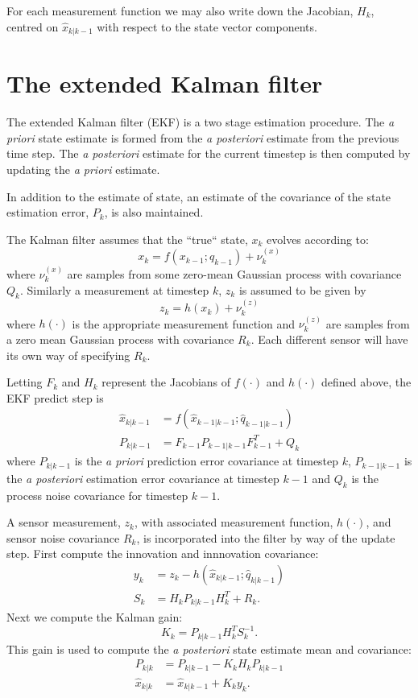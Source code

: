 \documentclass[a4paper]{paper}
\begin{document}
For each measurement function we may also write down the Jacobian, $H_k$,
centred on $\hat{x}_{k|k-1}$ with respect to the state vector components.

\section{The extended Kalman filter}

The extended Kalman filter (EKF) is a two stage estimation procedure. The
\emph{a priori} state estimate is formed from the \emph{a posteriori} estimate
from the previous time step. The \emph{a posteriori} estimate for the current
timestep is then computed by updating the \emph{a priori} estimate.

In addition to the estimate of state, an estimate of the covariance of the state
estimation error, $P_k$, is also maintained.

The Kalman filter assumes that the ``true`` state, $x_k$ evolves according to:
$$
x_k = f(x_{k-1}; q_{k-1}) + \nu^{(x)}_k
$$
where $\nu^{(x)}_k$ are samples from some zero-mean Gaussian process with
covariance $Q_k$. Similarly a measurement at timestep $k$, $z_k$ is assumed to
be given by
$$
z_k = h(x_k) + \nu^{(z)}_k
$$
where $h(\cdot)$ is the appropriate measurement function and $\nu^{(z)}_k$ are
samples from a zero mean Gaussian process with covariance $R_k$. Each different
sensor will have its own way of specifying $R_k$.

Letting $F_k$ and $H_k$ represent the Jacobians of $f(\cdot)$ and $h(\cdot)$
defined above, the EKF predict step is
\begin{align*}
	\hat{x}_{k|k-1} &= f(\hat{x}_{k-1|k-1}; \hat{q}_{k-1|k-1}) \\
	P_{k|k-1} &= F_{k-1} P_{k-1|k-1} F^T_{k-1} + Q_k
\end{align*}
where $P_{k|k-1}$ is the \emph{a priori} prediction error covariance at timestep
$k$, $P_{k-1|k-1}$ is the \emph{a posteriori} estimation error covariance at
timestep $k-1$ and $Q_k$ is the process noise covariance for timestep $k-1$.

A sensor measurement, $z_k$, with associated measurement function, $h(\cdot)$,
and sensor noise covariance $R_k$, is incorporated into the filter by way of the
update step. First compute the innovation and innnovation covariance:
\begin{align*}
	y_k &= z_k - h(\hat{x}_{k|k-1}; \hat{q}_{k|k-1})\\
	S_k &= H_k P_{k|k-1} H^T_k + R_k.
\end{align*}
Next we compute the Kalman gain:
$$ K_k = P_{k|k-1} H^T_k S^{-1}_k. $$
This gain is used to compute the \emph{a posteriori} state estimate mean and covariance:
\begin{align*}
	P_{k|k} &= P_{k|k-1} - K_k H_kP_{k|k-1}\\
	\hat{x}_{k|k} &= \hat{x}_{k|k-1} + K_k y_k.
\end{align*}
\end{document}
